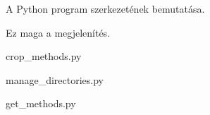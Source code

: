 
A Python program szerkezetének bemutatása.


Ez maga a megjelenítés.

\begin{python}
crop_methods.py
\end{python}


\begin{python}
manage_directories.py
\end{python}


\begin{python}
get_methods.py
\end{python}
